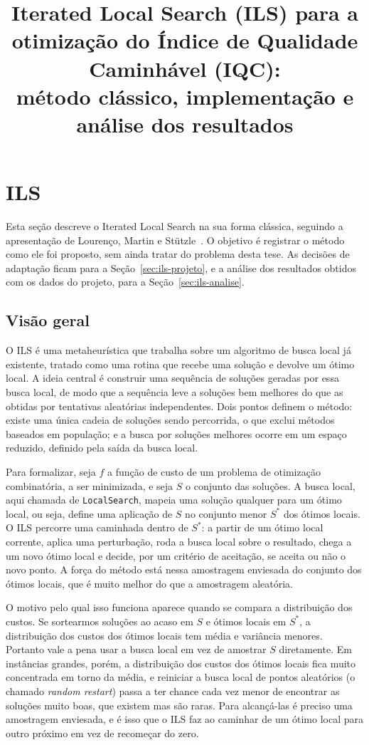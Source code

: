 \documentclass[11pt,a4paper]{article}
\title{Iterated Local Search (ILS) para a otimização do Índice de Qualidade Caminhável (IQC):\\ método clássico, implementação e análise dos resultados}
\author{}
\date{}
\newcommand{\code}[1]{\texttt{#1}}
\begin{document}
\maketitle

\section{ILS}
\label{sec:ils-teoria}

Esta seção descreve o Iterated Local Search na sua forma clássica, seguindo a apresentação de Lourenço, Martin e Stützle~\cite{lourenco2003ils}. O objetivo é registrar o método como ele foi proposto, sem ainda tratar do problema desta tese. As decisões de adaptação ficam para a Seção~\ref{sec:ils-projeto}, e a análise dos resultados obtidos com os dados do projeto, para a Seção~\ref{sec:ils-analise}.

\subsection{Visão geral}

O ILS é uma metaheurística que trabalha sobre um algoritmo de busca local já existente, tratado como uma rotina que recebe uma solução e devolve um ótimo local. A ideia central é construir uma sequência de soluções geradas por essa busca local, de modo que a sequência leve a soluções bem melhores do que as obtidas por tentativas aleatórias independentes. Dois pontos definem o método: existe uma única cadeia de soluções sendo percorrida, o que exclui métodos baseados em população; e a busca por soluções melhores ocorre em um espaço reduzido, definido pela saída da busca local.

Para formalizar, seja $f$ a função de custo de um problema de otimização combinatória, a ser minimizada, e seja $S$ o conjunto das soluções. A busca local, aqui chamada de \code{LocalSearch}, mapeia uma solução qualquer para um ótimo local, ou seja, define uma aplicação de $S$ no conjunto menor $S^\ast$ dos ótimos locais. O ILS percorre uma caminhada dentro de $S^\ast$: a partir de um ótimo local corrente, aplica uma perturbação, roda a busca local sobre o resultado, chega a um novo ótimo local e decide, por um critério de aceitação, se aceita ou não o novo ponto. A força do método está nessa amostragem enviesada do conjunto dos ótimos locais, que é muito melhor do que a amostragem aleatória.

O motivo pelo qual isso funciona aparece quando se compara a distribuição dos custos. Se sortearmos soluções ao acaso em $S$ e ótimos locais em $S^\ast$, a distribuição dos custos dos ótimos locais tem média e variância menores. Portanto vale a pena usar a busca local em vez de amostrar $S$ diretamente. Em instâncias grandes, porém, a distribuição dos custos dos ótimos locais fica muito concentrada em torno da média, e reiniciar a busca local de pontos aleatórios (o chamado \emph{random restart}) passa a ter chance cada vez menor de encontrar as soluções muito boas, que existem mas são raras. Para alcançá-las é preciso uma amostragem enviesada, e é isso que o ILS faz ao caminhar de um ótimo local para outro próximo em vez de recomeçar do zero.
\end{document}
